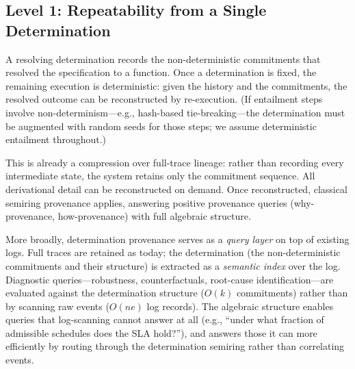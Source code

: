\subsection{Level 1: Repeatability from a Single Determination}

A resolving determination records the non-deterministic commitments
that resolved the specification to a function.
Once a determination is fixed, the remaining execution is deterministic:
given the history and the commitments, the resolved outcome can be
reconstructed by re-execution.
(If entailment steps involve non-determinism---e.g., hash-based
tie-breaking---the determination must be augmented with random seeds
for those steps; we assume deterministic entailment throughout.)

This is already a compression over full-trace lineage: rather than
recording every intermediate state, the system retains only the
commitment sequence.
All derivational detail can be reconstructed on demand.
Once reconstructed, classical semiring provenance applies, answering
positive provenance queries (why-provenance, how-provenance) with full
algebraic structure.

More broadly, determination provenance serves as a \emph{query layer}
on top of existing logs.
Full traces are retained as today; the determination (the
non-deterministic commitments and their structure) is extracted as a
\emph{semantic index} over the log.
Diagnostic queries---robustness, counterfactuals, root-cause
identification---are evaluated against the determination structure
($O(k)$ commitments) rather than by scanning raw events ($O(ne)$
log records).
The algebraic structure enables queries that log-scanning cannot answer
at all (e.g., ``under what fraction of admissible schedules does the
SLA hold?''), and answers those it can more efficiently by routing
through the determination semiring rather than correlating events.

